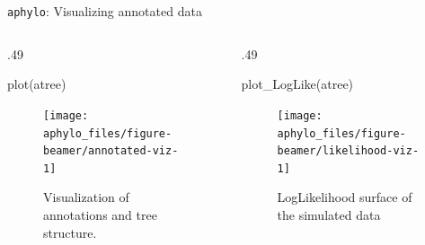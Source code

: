 \documentclass[9pt,ignorenonframetext,aspectratio=169]{beamer}
\newenvironment{Shaded}{\begin{snugshade}}{\end{snugshade}}
\newcommand{\KeywordTok}[1]{\textcolor[rgb]{0.94,0.87,0.69}{#1}}
\newcommand{\NormalTok}[1]{\textcolor[rgb]{0.80,0.80,0.80}{#1}}
\def\begincols{\begin{columns}[T]}
\def\begincol{\begin{column}[T]}
\def\endcol{\end{column}}
\def\endcols{\end{columns}}
\begin{document}
\begin{frame}[fragile,c]{\texttt{aphylo}: Visualizing annotated data}

\begincols

\begincol{.49\textwidth}

\footnotesize

\begin{Shaded}
\begin{Highlighting}[]
\KeywordTok{plot}\NormalTok{(atree)}
\end{Highlighting}
\end{Shaded}

\begin{figure}

{\centering \texttt{[image: aphylo\_files/figure-beamer/annotated-viz-1]} 

}

\caption{Visualization of annotations and tree structure.}\label{fig:annotated-viz}
\end{figure}

\normalsize

\endcol

\begincol{.49\textwidth}

\footnotesize

\begin{Shaded}
\begin{Highlighting}[]
\KeywordTok{plot_LogLike}\NormalTok{(atree)}
\end{Highlighting}
\end{Shaded}

\begin{figure}

{\centering \texttt{[image: aphylo\_files/figure-beamer/likelihood-viz-1]} 

}

\caption{LogLikelihood surface of the simulated data}\label{fig:likelihood-viz}
\end{figure}

\normalsize

\endcol

\endcols

\end{frame}
\end{document}
